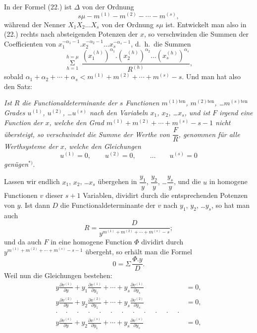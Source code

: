 \documentclass{article}
\begin{document}

In der Formel (22.) ist $\Delta$ von der Ordnung
\[
s\mu-m^{(1)}-m^{(2)}-\cdots-m^{(s)},
\]
während der Nenner $X_{1}X_{2}\ldots X_{s}$ von der Ordnung $s\mu$ ist. Entwickelt man also in (22.) rechts nach absteigenden Potenzen der $x$, so verschwinden die Summen der Coefficienten von $x_{1}^{-\alpha_{1}-1}.x_{2}^{-\alpha_{2}-1}\ldots x_{s}^{-\alpha_{s}-1}$, d.\ h.\ die Summen
\[
\mathop{\Sigma}\limits_{h=1}^{h=\mu}\,\frac{\left(x_{1}^{(h)}\right)^{\alpha_{1}}.\left(x_{2}^{(h)}\right)^{\alpha_{2}}\ldots\left(x_{s}^{(h)}\right)^{\alpha_{s}}}{R^{(h)}},
\]
sobald $\alpha_{1}+\alpha_{2}+\cdots+\alpha_{s}<m^{(1)}+m^{(2)}+\cdots+m^{(s)}-s$. Und man hat also den Satz:

\emph{Ist $R$ die Functionaldeterminante der $s$ Functionen $m^{(1)\text{ten}}$, $m^{(2)\text{ten}}$, \ldots $m^{(s)\text{ten}}$ Grades $u^{(1)}$, $u^{(2)}$, \ldots $u^{(s)}$ nach den Variabeln $x_{1}$, $x_{2}$, \ldots $x_{s}$, und ist $F$ irgend eine Function der $x$, welche den Grad $m^{(1)}+m^{(2)}+\cdots+m^{(s)}-s-1$ nicht übersteigt, so verschwindet die Summe der Werthe von $\dfrac{F}{R}$, genommen für alle Werthsysteme der $x$, welche den Gleichungen}
\[
u^{(1)}=0,\qquad u^{(2)}=0,\qquad \ldots\qquad u^{(s)}=0
\]
\emph{genügen}${}^{*)}$.

Lassen wir endlich $x_{1}$, $x_{2}$, \ldots $x_{s}$ übergehen in $\dfrac{y_{1}}{y}$, $\dfrac{y_{2}}{y}$, \ldots $\dfrac{y_{s}}{y}$, und die $u$ in homogene Functionen $v$ dieser $s+1$ Variablen, dividirt durch die entsprechenden Potenzen von $y$. Ist dann $D$ die Functionaldeterminante der $v$ nach $y_{1}$, $y_{2}$, \ldots $y_{s}$, so hat man auch
\[
R = \frac{D}{y^{m^{(1)}+m^{(2)}+\cdots+m^{(s)}-s}};
\]
und da auch $F$ in eine homogene Function $\Phi$ dividirt durch $y^{m^{(1)}+m^{(2)}+\cdots+m^{(s)}-s-1}$ übergeht, so erhält man die Formel
\[
0 = \Sigma\,\frac{\Phi.y}{D}.
\]
Weil nun die Gleichungen bestehen:
\[
\begin{aligned}
y\frac{\partial v^{(1)}}{\partial y}+y_{1}\frac{\partial v^{(1)}}{\partial y_{1}}+\cdots+y_{s}\frac{\partial v^{(1)}}{\partial y_{s}} &= 0,\\
y\frac{\partial v^{(2)}}{\partial y}+y_{2}\frac{\partial v^{(2)}}{\partial y_{1}}+\cdots+y_{s}\frac{\partial v^{(2)}}{\partial y_{s}} &= 0,\\
\cdot\quad\cdot\quad\cdot\quad\cdot\quad\cdot\quad\cdot\quad\cdot\quad\cdot\quad\cdot\quad\cdot\quad\cdot\quad\cdot &\\
y\frac{\partial v^{(s)}}{\partial y}+y_{2}\frac{\partial v^{(s)}}{\partial y_{1}}+\cdots+y_{s}\frac{\partial v^{(s)}}{\partial y_{s}} &= 0,
\end{aligned}
\]
\end{document}
